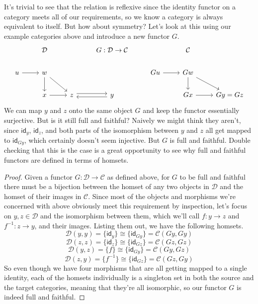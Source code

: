\documentclass[12pt]{article}
\newcounter{examp}
\begin{document}
It's trivial to see that the relation is reflexive since the identity functor on a category meets all of our requirements, so we know a category is always equivalent to itself.
But how about symmetry?
Let's look at this using our example categories above and introduce a new functor $G$.
\[\begin{tikzcd}
        & {\mathcal{D}} && {G:\mathcal{D}\rightarrow\mathcal{C}} && {\mathcal{C}} \\
        u & w &&& Gu & Gw \\
        & x & z & y && Gx & {Gy=Gz}
        \arrow[from=2-1, to=2-2]
        \arrow[from=2-2, to=3-2]
        \arrow[from=3-2, to=3-3]
        \arrow[from=2-2, to=3-3]
        \arrow[from=2-5, to=2-6]
        \arrow[from=2-6, to=3-6]
        \arrow[from=2-6, to=3-7]
        \arrow[from=3-6, to=3-7]
        \arrow[shift left, from=3-3, to=3-4]
        \arrow[shift left, from=3-4, to=3-3]
    \end{tikzcd}\]
We can map $y$ and $z$ onto the same object $G$ and keep the functor essentially surjective.
But is it still full and faithful?
Naively we might think they aren't, since $\mathsf{id}_y$, $\mathsf{id}_z$, and both parts of the isomorphism between $y$ and $z$ all get mapped to $\mathsf{id}_{Gy}$, which certainly doesn't seem injective.
But $G$ is full and faithful.
Double checking that this is the case is a great opportunity to see why full and faithful functors are defined in terms of homsets.
\begin{proof}
    Given a functor $G: \mathcal{D} \rightarrow \mathcal{C}$ as defined above, for $G$ to be full and faithful there must be a bijection between the homset of any two objects in $\mathcal{D}$ and the homset of their images in $\mathcal{C}$.
    Since most of the objects and morphisms we're concerned with above obviously meet this requirement by inspection, let's focus on $y,z \in \mathcal{D}$ and the isomorphism between them, which we'll call $f:y\rightarrow z$ and $f^{-1}:z\rightarrow y$, and their images.
    Listing them out, we have the following homsets.
    $$\mathcal{D}(y, y) = \{\mathsf{id}_y\} \cong \{\mathsf{id}_{Gy}\} = \mathcal{C}(Gy, Gy)$$
    $$\mathcal{D}(z, z) = \{\mathsf{id}_z\} \cong \{\mathsf{id}_{Gz}\} = \mathcal{C}(Gz, Gz)$$
    $$\mathcal{D}(y, z) = \{f\} \cong \{\mathsf{id}_{Gy}\} = \mathcal{C}(Gy, Gz)$$
    $$\mathcal{D}(z, y) = \{f^{-1}\} \cong \{\mathsf{id}_{Gz}\} = \mathcal{C}(Gz, Gy)$$
    So even though we have four morphisms that are all getting mapped to a single identity, each of the homsets individually is a singleton set in both the source and the target categories, meaning that they're all isomorphic, so our functor $G$ is indeed full and faithful.
\end{proof}
\end{document}
